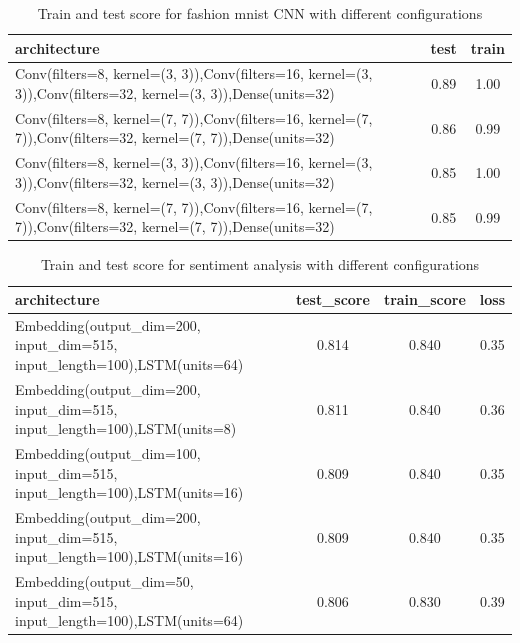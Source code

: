 \documentclass[10pt]{SelfArx} %
\begin{document}
\begin{table}[]
	\begin{tabular*}{1\linewidth}{@{\extracolsep{\fill} }lcc@{}}
		\toprule
		architecture & test & train  \\ \midrule
		Conv(filters=8, kernel=(3, 3)),Conv(filters=16, kernel=(3, 3)),Conv(filters=32, kernel=(3, 3)),Dense(units=32) & 0.89 & 1.00 \\
		Conv(filters=8, kernel=(7, 7)),Conv(filters=16, kernel=(7, 7)),Conv(filters=32, kernel=(7, 7)),Dense(units=32) & 0.86 & 0.99 \\
		Conv(filters=8, kernel=(3, 3)),Conv(filters=16, kernel=(3, 3)),Conv(filters=32, kernel=(3, 3)),Dense(units=32) & 0.85 & 1.00  \\
		Conv(filters=8, kernel=(7, 7)),Conv(filters=16, kernel=(7, 7)),Conv(filters=32, kernel=(7, 7)),Dense(units=32) & 0.85 & 0.99  \\ \bottomrule
	\end{tabular*}
	\caption{Train and test score for fashion mnist CNN  with different configurations}
	\label{tfashion5}
\end{table}

\begin{table}[]
	\begin{tabular*}{1\linewidth}{@{\extracolsep{\fill} }lccc@{}}
		\toprule
		architecture & test\_score & train\_score & loss \\ \midrule
		Embedding(output\_dim=200, input\_dim=515, input\_length=100),LSTM(units=64) & 0.814 & 0.840 & 0.35 \\
		Embedding(output\_dim=200, input\_dim=515, input\_length=100),LSTM(units=8) & 0.811 & 0.840 & 0.36 \\
		Embedding(output\_dim=100, input\_dim=515, input\_length=100),LSTM(units=16) & 0.809 & 0.840 & 0.35 \\
		Embedding(output\_dim=200, input\_dim=515, input\_length=100),LSTM(units=16) & 0.809 & 0.840 & 0.35 \\
		Embedding(output\_dim=50, input\_dim=515, input\_length=100),LSTM(units=64) & 0.806 & 0.830 & 0.39 \\ \bottomrule
	\end{tabular*}
	\caption{Train and test score for sentiment analysis with different configurations}
\label{tsentiment1}
\end{table}
\end{document}
